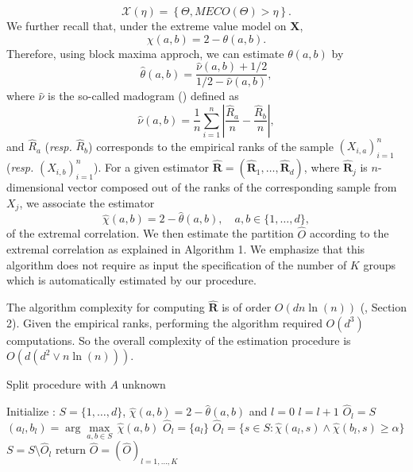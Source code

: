\documentclass[11pt]{article}
\begin{document}
	\begin{equation*}
		\mathcal{X}(\eta) = \left\{ \Theta, MECO(\Theta) > \eta \right\}.
	\end{equation*}
	We further recall that, under the extreme value model on $\textbf{X}$,
	\begin{equation}
		\chi(a,b) = 2 - \theta(a,b).
	\end{equation}
	Therefore, using block maxima approch, we can estimate $\theta(a,b)$ by 
	\begin{equation*}
		\hat{\theta}(a,b) = \frac{\hat{\nu}(a,b) + 1/2}{1/2 - \hat{\nu}(a,b)},
	\end{equation*}
	where $\hat{\nu}$ is the so-called madogram (\cite{cooley2006variograms}) defined as
	\begin{equation*}
		\hat{\nu}(a,b) = \frac{1}{n} \sum_{i=1}^n \left| \frac{\hat{R}_a}{n} - \frac{\hat{R}_b}{n} \right|,
	\end{equation*}
	and $\hat{R}_a$ (\emph{resp.} $\hat{R}_b$) corresponds to the empirical ranks of the sample $(X_{i,a})_{i=1}^n$ (\emph{resp.} $(X_{i,b})_{i=1}^n$). For a given estimator $\hat{\textbf{R}} = (\hat{\textbf{R}}_1, \dots, \hat{\textbf{R}}_d)$, where $\hat{\textbf{R}}_j$ is $n$-dimensional vector composed out of the ranks of the corresponding sample from $X_j$, we associate the estimator
	\begin{equation*}
		\hat{\chi}(a,b) = 2 - \hat{\theta}(a,b), \quad  a,b \in \{1,\dots, d\},
	\end{equation*}
	of the extremal correlation. We then estimate the partition $\hat{O}$ according to the extremal correlation as explained in Algorithm 1. We emphasize that this algorithm does not require as input the specification of the number of $K$ groups which is automatically estimated by our procedure.
	
	The algorithm complexity for computing $\hat{\textbf{R}}$ is of order $O(dn \ln(n))$ (\cite{cormen2022introduction}, Section 2). Given the empirical ranks, performing the algorithm required $O(d^3)$ computations. So the overall complexity of the estimation procedure is $O(d(d^2 \vee n \ln (n)))$.
	\begin{algorithm}
	
	\caption{Split procedure with $A$ unknown}

\begin{algorithmic}[1]
    \State Initialize : $S = \{1,\dots,d\}$, $\hat{\chi}(a,b) = 2 - \hat{\theta}(a,b)$ and $l = 0$
    		\State $l = l +1$
    			\State $\hat{O}_l = S$
    		\EndIf
    			\State $(a_l, b_l) = \arg \underset{a,b \in S}{\max} \, \hat{\chi}(a,b)$
    				\State $\hat{O}_l = \{a_l\}$
    			\EndIf
    				\State $\hat{O}_l = \{ s \in S : \hat{\chi}(a_l,s) \wedge \hat{\chi}(b_l,s) \geq \alpha \}$
    			\EndIf
    		\EndIf
    		\State $S = S \setminus \hat{O}_l$
    	\EndWhile
    \State return $\hat{O} = (\hat{O})_{l = 1, \dots,K}$
\EndProcedure
\end{algorithmic}
\label{alg:rec_pratic}
\end{algorithm}
\end{document}

